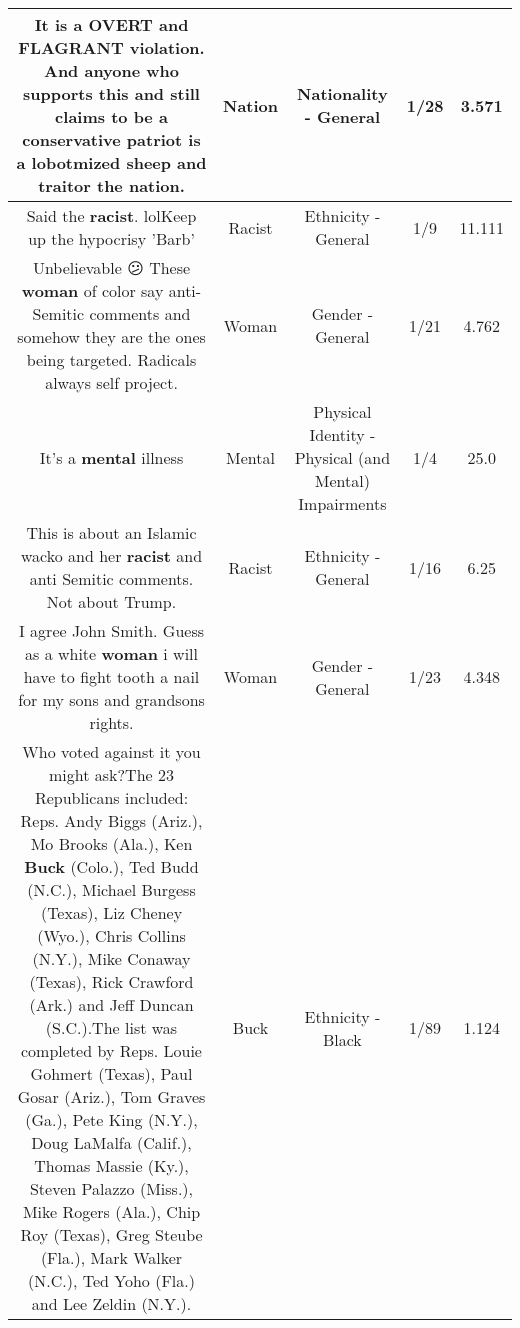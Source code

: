 \documentclass[11pt]{article}
\newlength\mylength
\begin{document}
\begin{center}
\begin{longtable}{|C{.65\mylength}|C{.30\mylength}|C{.12\mylength}|C{.12\mylength}|C{.12\mylength}|}
  \small It is a OVERT and FLAGRANT violation. And anyone who supports this and still claims to be a conservative patriot is a lobotmized sheep and traitor the \textbf{nation}.\normalsize   & Nation & Nationality - General & 1/28 & 3.571 \\  \hline
  \small Said the \textbf{racist}. lolKeep up the hypocrisy 'Barb'\normalsize   & Racist & Ethnicity - General & 1/9 & 11.111 \\  \hline
  \small Unbelievable 😕 These \textbf{woman} of color say anti-Semitic comments and somehow they are the ones being targeted. Radicals always self project.\normalsize   & Woman & Gender - General & 1/21 & 4.762 \\  \hline
  \small It's a \textbf{mental} illness\normalsize   & Mental & Physical Identity - Physical (and Mental) Impairments & 1/4 & 25.0 \\  \hline
  \small This is about an Islamic wacko and her \textbf{racist} and anti Semitic comments. Not about Trump.\normalsize   & Racist & Ethnicity - General & 1/16 & 6.25 \\  \hline
  \small I agree John Smith. Guess as a white \textbf{woman} i will have to fight tooth a nail for my sons and grandsons rights.\normalsize   & Woman & Gender - General & 1/23 & 4.348 \\  \hline
  \small Who voted against it you might ask?The 23 Republicans included: Reps. Andy Biggs (Ariz.), Mo Brooks (Ala.), Ken \textbf{Buck} (Colo.), Ted Budd (N.C.), Michael Burgess (Texas), Liz Cheney (Wyo.), Chris Collins (N.Y.), Mike Conaway (Texas), Rick Crawford (Ark.) and Jeff Duncan (S.C.).The list was completed by Reps. Louie Gohmert (Texas), Paul Gosar (Ariz.), Tom Graves (Ga.), Pete King (N.Y.), Doug LaMalfa (Calif.), Thomas Massie (Ky.), Steven Palazzo (Miss.), Mike Rogers (Ala.), Chip Roy (Texas), Greg Steube (Fla.), Mark Walker (N.C.), Ted Yoho (Fla.) and Lee Zeldin (N.Y.).\normalsize   & Buck & Ethnicity - Black & 1/89 & 1.124 \\  \hline

\end{longtable}
\end{center}
\end{document}
